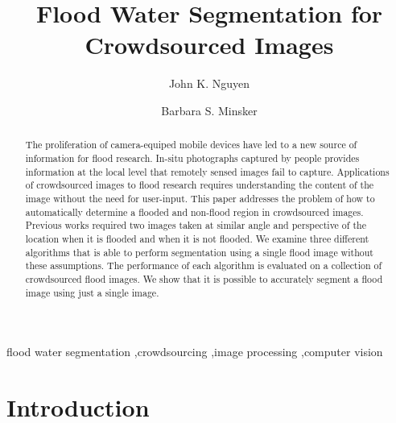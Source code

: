 \documentclass[review]{elsarticle}
\begin{document}
\begin{frontmatter}

\title{Flood Water Segmentation for Crowdsourced Images}

\author[mymainaddress]{John K. Nguyen}
\address[mymainaddress]{Illinois Informatics Institute, University of Illinois at Urbana-Champaign}

\author[mysecondaryaddress]{Barbara S. Minsker}

\address[mysecondaryaddress]{Civil \& Environmental Engineering Department, Southern Methodist University}

\begin{abstract}
The proliferation of camera-equiped mobile devices have led to a new source of information for flood research. In-situ photographs captured by people provides information at the local level that remotely sensed images fail to capture. Applications of crowdsourced images to flood research requires understanding the content of the image without the need for user-input. This paper addresses the problem of how to automatically determine a flooded and non-flood region in crowdsourced images. Previous works required two images taken at similar angle and perspective of the location when it is flooded and when it is not flooded. We examine three different algorithms that is able to perform segmentation using a single flood image without these assumptions. The performance of each algorithm is evaluated on a collection of crowdsourced flood images. We show that it is possible to accurately segment a flood image using just a single image.
\end{abstract}

\begin{keyword}
flood water segmentation \sep crowdsourcing \sep image processing \sep computer vision
\end{keyword}

\end{frontmatter}

\linenumbers

\section{Introduction}
\end{document}
